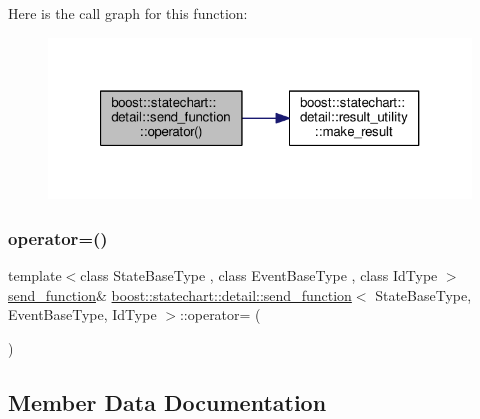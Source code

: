 Here is the call graph for this function\+:
\nopagebreak
\begin{figure}[H]
\begin{center}
\leavevmode
\includegraphics[width=321pt]{classboost_1_1statechart_1_1detail_1_1send__function_a129380b34d86c3e11ce9688e208e32ca_cgraph}
\end{center}
\end{figure}
\mbox{\label{classboost_1_1statechart_1_1detail_1_1send__function_a70373b8c5f8828b48f9284b23ae8ccae}} 
\subsubsection{\texorpdfstring{operator=()}{operator=()}}
{\footnotesize\ttfamily template$<$class State\+Base\+Type , class Event\+Base\+Type , class Id\+Type $>$ \\
\mbox{\hyperlink{classboost_1_1statechart_1_1detail_1_1send__function}{send\+\_\+function}}\& \mbox{\hyperlink{classboost_1_1statechart_1_1detail_1_1send__function}{boost\+::statechart\+::detail\+::send\+\_\+function}}$<$ State\+Base\+Type, Event\+Base\+Type, Id\+Type $>$\+::operator= (\begin{DoxyParamCaption}\item[{const \mbox{\hyperlink{classboost_1_1statechart_1_1detail_1_1send__function}{send\+\_\+function}}$<$ State\+Base\+Type, Event\+Base\+Type, Id\+Type $>$ \&}]{ }\end{DoxyParamCaption})\hspace{0.3cm}{\ttfamily [private]}}



\subsection{Member Data Documentation}
\mbox{\label{classboost_1_1statechart_1_1detail_1_1send__function_a7d5fc4bb3b0bfeb1486ab83bd1617f0a}} 
